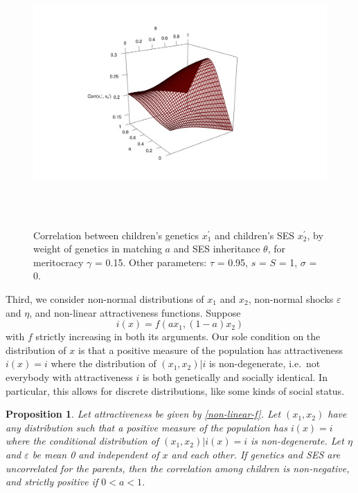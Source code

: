 \documentclass[
]{article}
\newtheorem{proposition}{Proposition}
\theoremstyle{definition}
\theoremstyle{definition}
\theoremstyle{definition}
\theoremstyle{definition}
\theoremstyle{remark}
\begin{document}
\begin{figure}

{\centering \includegraphics[height=4in]{trading-genetics_files/figure-latex/pic-gamma-2-rgl} 

}

\caption{Correlation between children's genetics $x^\prime_1$ and children's SES $x^\prime_2$, by weight of genetics in matching $a$ and SES inheritance $\theta$, for meritocracy $\gamma$ = 0.15. Other parameters: $\tau$ = 0.95, $s$ = $S$ = 1, $\sigma$ = 0.}\label{fig:pic-gamma}
\end{figure}

Third, we consider non-normal distributions of \(x_1\) and \(x_2\), non-normal
shocks \(\varepsilon\) and \(\eta\), and non-linear attractiveness functions. Suppose
\begin{equation}\label{non-linear-f} 
i(x) = f(ax_1, (1-a)x_2) 
\end{equation}
with \(f\) strictly increasing in both its arguments. Our sole condition on the
distribution of \(x\) is that a positive measure of the population has
attractiveness \(i(x) = i\) where the distribution of \((x_1, x_2)|i\) is
non-degenerate, i.e.~not everybody with attractiveness \(i\) is both genetically
and socially identical. In particular, this allows for discrete distributions,
like some kinds of social status.

\begin{proposition}\label{prop-non-normal}
Let attractiveness be given by \eqref{non-linear-f}. Let $(x_1, x_2)$ have
any distribution such that a positive measure of the population has
$i(x) = i$ where the conditional distribution of $(x_1, x_2)|i(x) = i$ is 
non-degenerate. Let $\eta$ and $\varepsilon$ be mean 0 and independent of
$x$ and each other. If genetics and SES are uncorrelated for the parents, then
the correlation among children is non-negative, and strictly positive if 
$0 < a < 1$.
\end{proposition}
\end{document}

